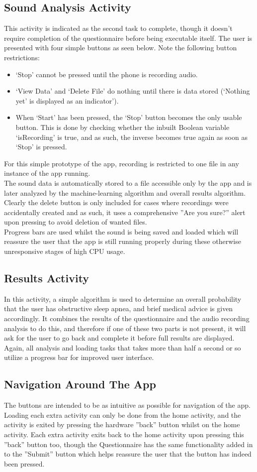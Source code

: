 \subsection{Sound Analysis Activity}
This activity is indicated as the second task to complete, though it doesn’t require completion of the questionnaire before being executable itself. The user is presented with four simple buttons as seen below. Note the following button restrictions:
\begin{itemize}
\item ‘Stop’ cannot be pressed until the phone is recording audio.
\item ‘View Data’ and ‘Delete File’ do nothing until there is data stored (‘Nothing yet’ is displayed as an indicator’).
\item When ‘Start’ has been pressed, the ‘Stop’ button becomes the only usable button. This is done by checking whether the inbuilt Boolean variable ‘isRecording’ is true, and as such, the inverse becomes true again as soon as ‘Stop’ is pressed.
\end{itemize}
For this simple prototype of the app, recording is restricted to one file in any instance of the app running.
\\ The sound data is automatically stored to a file accessible only by the app and is later analyzed by the machine-learning algorithm and overall results algorithm. Clearly the delete button is only included for cases where recordings were accidentally created and as such, it uses a comprehensive ''Are you sure?'' alert upon pressing to avoid deletion of wanted files.
\\Progress bars are used whilst the sound is being saved and loaded which will reassure the user that the app is still running properly during these otherwise unresponsive stages of high CPU usage. 
\subsection{Results Activity}
In this activity, a simple algorithm is used to determine an overall probability that the user has obstructive sleep apnea, and brief medical advice is given accordingly. It combines the results of the questionnaire and the audio recording analysis to do this, and therefore if one of these two parts is not present, it will ask for the user to go back and complete it before full results are displayed. Again, all analysis and loading tasks that takes more than half a second or so utilize a progress bar for improved user interface.
\subsection{Navigation Around The App}
The buttons are intended to be as intuitive as possible for navigation of the app. Loading each extra activity can only be done from the home activity, and the activity is exited by pressing the hardware ''back'' button whilst on the home activity. Each extra activity exits back to the home activity upon pressing this ''back'' button too, though the Questionnaire has the same functionality added in to the ''Submit'' button which helps reassure the user that the button has indeed been pressed.
